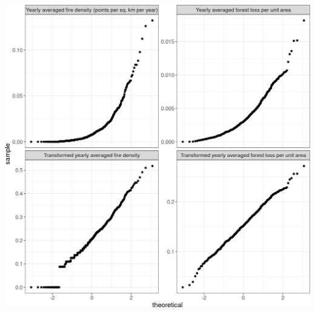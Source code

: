 \documentclass[10pt,landscape,a3paper]{article}
\begin{document}
\begin{center}\includegraphics{img/modelling/lta-esda-15} \end{center}
\end{document}

